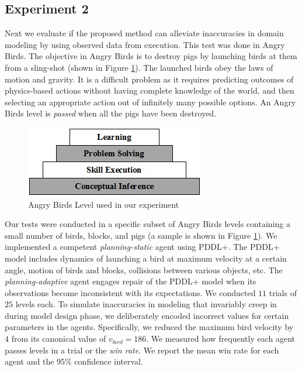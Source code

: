 \documentclass[letterpaper]{article} %
\begin{document}
\subsection{Experiment 2}
Next we evaluate if the proposed method can alleviate inaccuracies in domain modeling by using observed data from execution. This test was done in Angry Birds. The objective in Angry Birds is to destroy pigs by launching birds at them from a sling-shot (shown in Figure \ref{fig:ab_level}). The launched birds obey the laws of motion and gravity. It is a difficult problem as it requires predicting outcomes of physics-based actions without having complete knowledge of the world, and then selecting an appropriate action out of infinitely many possible options. An Angry Birds level is \emph{passed} when all the pigs have been destroyed.

\begin{figure}
\centering
\includegraphics[width=0.9\columnwidth]{cascade.png}
\caption{Angry Birds Level used in our experiment}
\label{fig:ab_level}
\end{figure}


Our tests were conducted in a specific subset of Angry Birds levels containing a small number of birds, blocks, and pigs (a sample is shown in Figure \ref{fig:ab_level}). We implemented a competent \emph{planning-static} agent using PDDL+. The PDDL+ model includes dynamics of launching a bird at maximum velocity at a certain angle, motion of birds and blocks, collisions between various objects, etc. The \emph{planning-adaptive} agent engages repair of the PDDL+ model when its observations become inconsistent with its expectations. We conducted $11$ trials of $25$ levels each. To simulate inaccuracies in modeling that invariably creep in during model design phase, we deliberately encoded incorrect values for certain parameters in the agents. Specifically, we reduced the maximum bird velocity by $4$ from its canonical value of $v_{bird}=186$. We measured how frequently each agent passes levels in a trial or the \emph{win rate}.
We report the mean win rate for each agent and the $95\%$ confidence interval.
\end{document}
